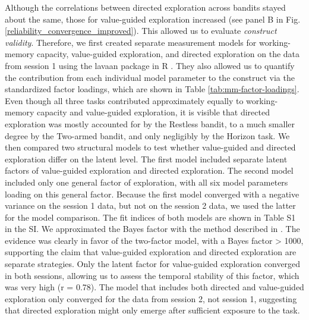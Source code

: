 \documentclass[fleqn,10pt]{wlscirep}
\begin{document}
Although the correlations between directed exploration across bandits stayed about the same, those for value-guided exploration increased (see panel B in Fig. \ref{reliability_convergence_improved}). This allowed us to evaluate \textit{construct validity}. Therefore, we first created separate measurement models for working-memory capacity, value-guided exploration, and directed exploration on the data from session 1 using the lavaan package \cite{lavaan} in R \cite{rstats}. They also allowed us to quantify the contribution from each individual model parameter to the construct via the standardized factor loadings, which are shown in Table \ref{tab:mm-factor-loadings}. Even though all three tasks contributed approximately equally to working-memory capacity and value-guided exploration, it is visible that directed exploration was mostly accounted for by the Restless bandit, to a much smaller degree by the Two-armed bandit, and only negligibly by the Horizon task. We then compared two structural models to test whether value-guided and directed exploration differ on the latent level. The first model included separate latent factors of value-guided exploration and directed exploration. The second model included only one general factor of exploration, with all six model parameters loading on this general factor. Because the first model converged with a negative variance on the session 1 data, but not on the session 2 data, we used the latter for the model comparison. The fit indices of both models are shown in Table S1 in the SI. We approximated the Bayes factor with the method described in \cite{wagenmakers_practical_2007}. The evidence was clearly in favor of the two-factor model, with a Bayes factor > 1000, supporting the claim that value-guided exploration and directed exploration are separate strategies. Only the latent factor for value-guided exploration converged in both sessions, allowing us to assess the temporal stability of this factor, which was very high (r = 0.78). The model that includes both directed and value-guided exploration only converged for the data from session 2, not session 1, suggesting that directed exploration might only emerge after sufficient exposure to the task.
\end{document}
